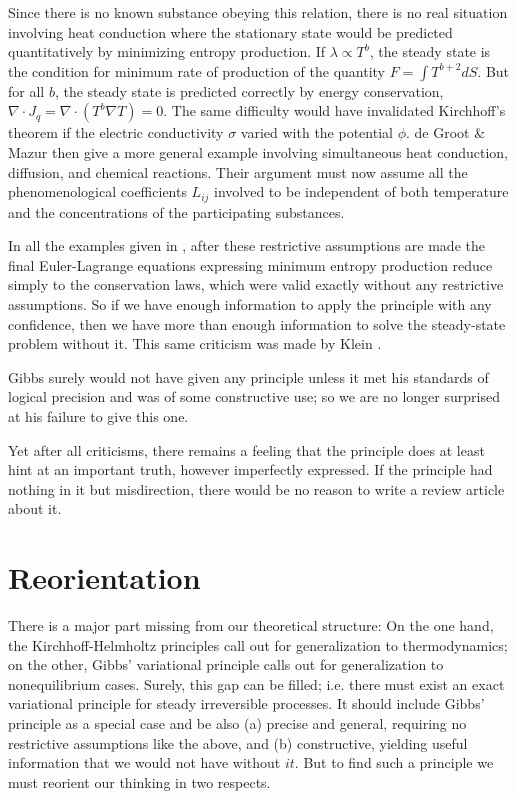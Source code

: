 \documentclass{article}
\begin{document}
Since there is no known substance obeying this relation, there is no real situation involving heat conduction where the stationary state would be predicted quantitatively by minimizing entropy production. If $\lambda \propto T^b$, the steady state is the condition for minimum rate of production of the quantity $F=\int T^{b+2} d S$. But for all $b$, the steady state is predicted correctly by energy conservation, $\nabla \cdot J_q=\nabla \cdot\left(T^b \nabla T\right)=0$. The same difficulty would have invalidated Kirchhoff's theorem if the electric conductivity $\sigma$ varied with the potential $\phi$.
de Groot \& Mazur then give a more general example involving simultaneous heat conduction, diffusion, and chemical reactions. Their argument must now assume all the phenomenological coefficients $L_{i j}$ involved to be independent of both temperature and the concentrations of the participating substances.

In all the examples given in \cite{prigogine1961;degroot1962}, after these restrictive assumptions are made the final Euler-Lagrange equations expressing minimum entropy production reduce simply to the conservation laws, which were valid exactly without any restrictive assumptions. So if we have enough information to apply the principle with any confidence, then we have more than enough information to solve the steady-state problem without it. This same criticism was made by Klein \cite{klein1960}.

Gibbs surely would not have given any principle unless it met his standards of logical precision and was of some constructive use; so we are no longer surprised at his failure to give this one.

Yet after all criticisms, there remains a feeling that the principle does at least hint at an important truth, however imperfectly expressed. If the principle had nothing in it but misdirection, there would be no reason to write a review article about it.

\section{Reorientation}

There is a major part missing from our theoretical structure: On the one hand, the Kirchhoff-Helmholtz principles call out for generalization to thermodynamics; on the other, Gibbs' variational principle calls out for generalization to nonequilibrium cases. Surely, this gap can be filled; i.e. there must exist an exact variational principle for steady irreversible processes. It should include Gibbs' principle as a special case and be also (a) precise and general, requiring no restrictive assumptions like the above, and (b) constructive, yielding useful information that we would not have without $i t$. But to find such a principle we must reorient our thinking in two respects.
\end{document}
